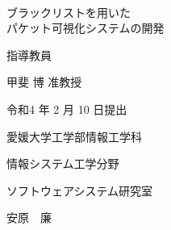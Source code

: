\pagestyle{empty}
\setlength{\oddsidemargin}{-2.0cm}
\setlength{\textwidth}{20cm}

\
\vspace{3cm}

\begin{center}
{\LARGE {ブラックリストを用いた\\パケット可視化システムの開発}}\\

\vspace{9mm}

{\Large 指導教員}

\vspace{5mm}

{\Large 甲斐 博 准教授}\\

\vspace{6cm}

{\Large 令和4 年 2 月 10 日提出}\\

\vspace{20mm}

{\Large 愛媛大学工学部情報工学科}\\

\vspace{4mm}

{\Large 情報システム工学分野}\\

\vspace{4mm}

{\Large ソフトウェアシステム研究室}\\

\vspace{18mm}

{\huge 安原　廉}\\

\end{center}


